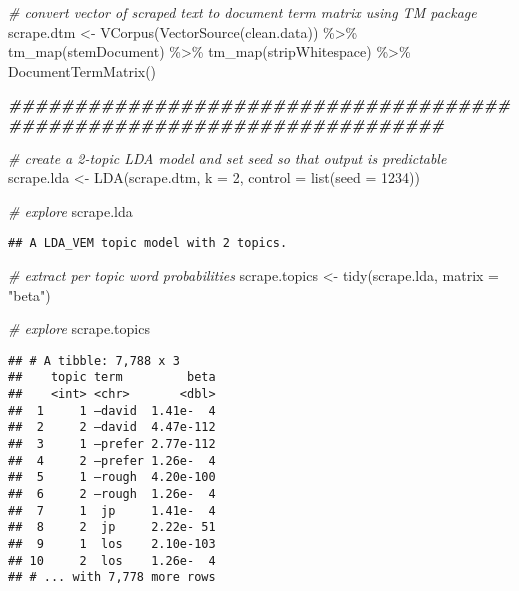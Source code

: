 \documentclass[
]{article}
\newenvironment{Shaded}{\begin{snugshade}}{\end{snugshade}}
\newcommand{\AttributeTok}[1]{\textcolor[rgb]{0.77,0.63,0.00}{#1}}
\newcommand{\CommentTok}[1]{\textcolor[rgb]{0.56,0.35,0.01}{\textit{#1}}}
\newcommand{\DecValTok}[1]{\textcolor[rgb]{0.00,0.00,0.81}{#1}}
\newcommand{\DocumentationTok}[1]{\textcolor[rgb]{0.56,0.35,0.01}{\textbf{\textit{#1}}}}
\newcommand{\FunctionTok}[1]{\textcolor[rgb]{0.00,0.00,0.00}{#1}}
\newcommand{\NormalTok}[1]{#1}
\newcommand{\OtherTok}[1]{\textcolor[rgb]{0.56,0.35,0.01}{#1}}
\newcommand{\SpecialCharTok}[1]{\textcolor[rgb]{0.00,0.00,0.00}{#1}}
\newcommand{\StringTok}[1]{\textcolor[rgb]{0.31,0.60,0.02}{#1}}
\begin{document}
\begin{Shaded}
\begin{Highlighting}[]
\CommentTok{\# convert vector of scraped text to document term matrix using TM package}
\NormalTok{scrape.dtm }\OtherTok{\textless{}{-}} \FunctionTok{VCorpus}\NormalTok{(}\FunctionTok{VectorSource}\NormalTok{(clean.data)) }\SpecialCharTok{\%\textgreater{}\%}
  \FunctionTok{tm\_map}\NormalTok{(stemDocument) }\SpecialCharTok{\%\textgreater{}\%}
  \FunctionTok{tm\_map}\NormalTok{(stripWhitespace) }\SpecialCharTok{\%\textgreater{}\%}
  \FunctionTok{DocumentTermMatrix}\NormalTok{()}

\DocumentationTok{\#\#\#\#\#\#\#\#\#\#\#\#\#\#\#\#\#\#\#\#\#\#\#\#\#\#\#\#\#\#\#\#\#\#\#\#\#\#\#\#\#\#\#\#\#\#\#\#\#\#\#\#\#\#\#\#\#\#\#\#\#\#\#\#\#\#\#\#\#\#\#}


\CommentTok{\# create a 2{-}topic LDA model and set seed so that output is predictable}
\NormalTok{scrape.lda }\OtherTok{\textless{}{-}} \FunctionTok{LDA}\NormalTok{(scrape.dtm, }\AttributeTok{k =} \DecValTok{2}\NormalTok{, }\AttributeTok{control =} \FunctionTok{list}\NormalTok{(}\AttributeTok{seed =} \DecValTok{1234}\NormalTok{))}

\CommentTok{\# explore}
\NormalTok{scrape.lda}
\end{Highlighting}
\end{Shaded}

\begin{verbatim}
## A LDA_VEM topic model with 2 topics.
\end{verbatim}

\begin{Shaded}
\begin{Highlighting}[]
\CommentTok{\# extract per topic word probabilities}
\NormalTok{scrape.topics }\OtherTok{\textless{}{-}} \FunctionTok{tidy}\NormalTok{(scrape.lda, }\AttributeTok{matrix =} \StringTok{"beta"}\NormalTok{)}

\CommentTok{\# explore}
\NormalTok{scrape.topics}
\end{Highlighting}
\end{Shaded}

\begin{verbatim}
## # A tibble: 7,788 x 3
##    topic term         beta
##    <int> <chr>       <dbl>
##  1     1 —david  1.41e-  4
##  2     2 —david  4.47e-112
##  3     1 —prefer 2.77e-112
##  4     2 —prefer 1.26e-  4
##  5     1 —rough  4.20e-100
##  6     2 —rough  1.26e-  4
##  7     1  jp     1.41e-  4
##  8     2  jp     2.22e- 51
##  9     1  los    2.10e-103
## 10     2  los    1.26e-  4
## # ... with 7,778 more rows
\end{verbatim}
\end{document}
